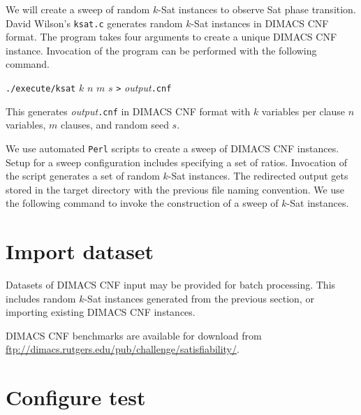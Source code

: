 	We will create a sweep of random $k$-{\sc Sat} instances to observe {\sc Sat} phase transition.  David Wilson's \texttt{ksat.c} generates random $k$-{\sc Sat} instances in DIMACS CNF format.  The program takes four arguments to create a unique DIMACS CNF instance.  Invocation of the program can be performed with the following command.

\begin{center}

\texttt{./execute/ksat} $k$ $n$ $m$ $s$ \texttt{>} \textit{output}\texttt{.cnf}

\end{center}

This generates \textit{output}\texttt{.cnf} in DIMACS CNF format with $k$ variables per clause $n$ variables, $m$ clauses, and random seed $s$.


We use automated \texttt{Perl} scripts to create a sweep of DIMACS CNF instances.  Setup for a sweep configuration includes specifying a set of ratios.  Invocation of the script generates a set of random $k$-{\sc Sat} instances.  The redirected output gets stored in the target directory with the previous file naming convention.  We use the following command to invoke the construction of a sweep of $k$-{\sc Sat} instances.







	\section{Import dataset}


Datasets of DIMACS CNF input may be provided for batch processing.  This includes random $k$-{\sc Sat} instances generated from the previous section, or importing existing DIMACS CNF instances.   


DIMACS CNF benchmarks are available for download from \url{ftp://dimacs.rutgers.edu/pub/challenge/satisfiability/}.


	\section{Configure test}


